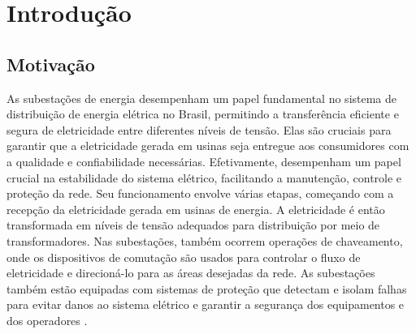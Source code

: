 \chapter{Introdução}

\section{Motivação}
\label{sec:motivation}

As subestações de energia desempenham um papel fundamental no sistema de distribuição de energia elétrica no Brasil, permitindo a transferência eficiente e segura de eletricidade entre diferentes níveis de tensão. Elas são cruciais para garantir que a eletricidade gerada em usinas seja entregue aos consumidores com a qualidade e confiabilidade necessárias. Efetivamente, desempenham um papel crucial na estabilidade do sistema elétrico, facilitando a manutenção, controle e proteção da rede. Seu funcionamento envolve várias etapas, começando com a recepção da eletricidade gerada em usinas de energia. A eletricidade é então transformada em níveis de tensão adequados para distribuição por meio de transformadores. Nas subestações, também ocorrem operações de chaveamento, onde os dispositivos de comutação são usados para controlar o fluxo de eletricidade e direcioná-lo para as áreas desejadas da rede. As subestações também estão equipadas com sistemas de proteção que detectam e isolam falhas para evitar danos ao sistema elétrico e garantir a segurança dos equipamentos e dos operadores \cite {randolph2013electric}.

